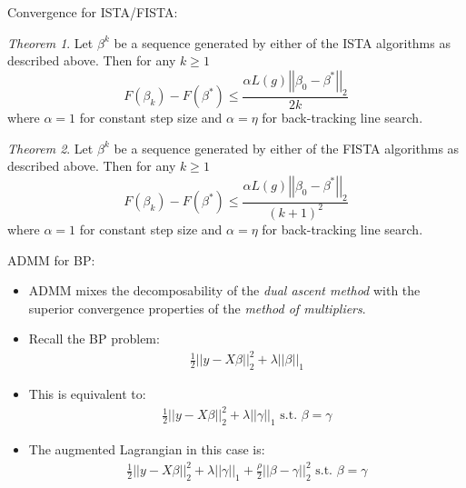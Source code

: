 \documentclass[xcolor=dvipsnames,aspectratio=1610]{beamer}
\newcommand{\norm}[1]{\left|\left|#1\right|\right|}
\theoremstyle{remark}
\newtheorem{thm}{Theorem}
\begin{document}
\begin{frame}{Convergence for ISTA/FISTA:}
\begin{thm}
Let $\beta^k$ be a sequence generated by either of the ISTA algorithms as described above. Then for any $k\geq 1$
$$
F(\beta_k) - F(\beta^*) \leq \frac{\alpha L(g) \norm{\beta_0 - \beta^*}_2}{2k}
$$
where $\alpha = 1$ for constant step size and $\alpha = \eta$ for back-tracking line search.
\end{thm}

\begin{thm}
Let $\beta^k$ be a sequence generated by either of the FISTA algorithms as described above. Then for any $k\geq 1$
$$
F(\beta_k) - F(\beta^*) \leq \frac{\alpha L(g) \norm{\beta_0 - \beta^*}_2}{(k+1)^2}
$$
where $\alpha = 1$ for constant step size and $\alpha = \eta$ for back-tracking line search.
\end{thm}
\end{frame}

\begin{frame}{ADMM for BP:}
  \begin{itemize}
    \setlength{\itemsep}{10pt}
\item ADMM mixes the decomposability of the \textit{dual ascent method} with the superior convergence properties of the \textit{method of multipliers}. 
\item Recall the BP problem:
\begin{align*}
\frac{1}{2}\norm{y- X \beta}_2^2 + \lambda
  \norm{\beta}_1 
\end{align*}
\item This is equivalent to:
\begin{align*}
\frac{1}{2}\norm{y- X \beta}_2^2 + \lambda
  \norm{\gamma}_1 \text{ s.t. } \beta = \gamma
\end{align*}
\item The augmented Lagrangian in this case is: 
\begin{align*}
 \frac{1}{2}\norm{y- X \beta}_2^2 + \lambda
  \norm{\gamma}_1 + \frac{\rho}{2} \norm{\beta - \gamma}_2^2 \text{ s.t. } \beta = \gamma
\end{align*}
  \end{itemize}
\end{frame}
\end{document}
